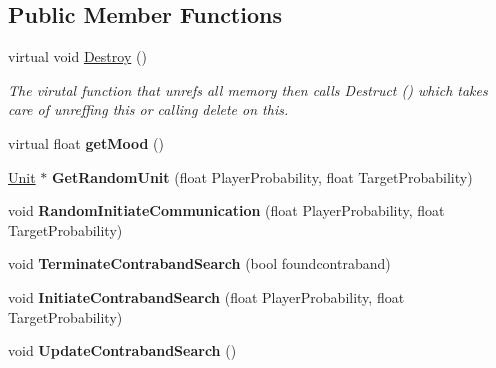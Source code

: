 \subsection*{Public Member Functions}
\begin{DoxyCompactItemize}
\item 
virtual void \hyperlink{classCommunicatingAI_ac1ba228f69815ab82e08c7277919a2ed}{Destroy} ()\hypertarget{classCommunicatingAI_ac1ba228f69815ab82e08c7277919a2ed}{}\label{classCommunicatingAI_ac1ba228f69815ab82e08c7277919a2ed}

\begin{DoxyCompactList}\small\item\em The virutal function that unrefs all memory then calls Destruct () which takes care of unreffing this or calling delete on this. \end{DoxyCompactList}\item 
virtual float {\bfseries get\+Mood} ()\hypertarget{classCommunicatingAI_ad40507377c0a80e481cbfaff5c0b7954}{}\label{classCommunicatingAI_ad40507377c0a80e481cbfaff5c0b7954}

\item 
\hyperlink{classUnit}{Unit} $\ast$ {\bfseries Get\+Random\+Unit} (float Player\+Probability, float Target\+Probability)\hypertarget{classCommunicatingAI_a26cf23858b5830195d889856fbbf399e}{}\label{classCommunicatingAI_a26cf23858b5830195d889856fbbf399e}

\item 
void {\bfseries Random\+Initiate\+Communication} (float Player\+Probability, float Target\+Probability)\hypertarget{classCommunicatingAI_a2aa20dd1630981dbe7f58e95fcba7831}{}\label{classCommunicatingAI_a2aa20dd1630981dbe7f58e95fcba7831}

\item 
void {\bfseries Terminate\+Contraband\+Search} (bool foundcontraband)\hypertarget{classCommunicatingAI_ab193cabfa5e7edbf345cb54cb71560c1}{}\label{classCommunicatingAI_ab193cabfa5e7edbf345cb54cb71560c1}

\item 
void {\bfseries Initiate\+Contraband\+Search} (float Player\+Probability, float Target\+Probability)\hypertarget{classCommunicatingAI_a7f029927ff4f301760b3f613ba517ec3}{}\label{classCommunicatingAI_a7f029927ff4f301760b3f613ba517ec3}

\item 
void {\bfseries Update\+Contraband\+Search} ()\hypertarget{classCommunicatingAI_ad8b2df74c717cd4717f9a6f97c462553}{}\label{classCommunicatingAI_ad8b2df74c717cd4717f9a6f97c462553}


\end{DoxyCompactItemize}
